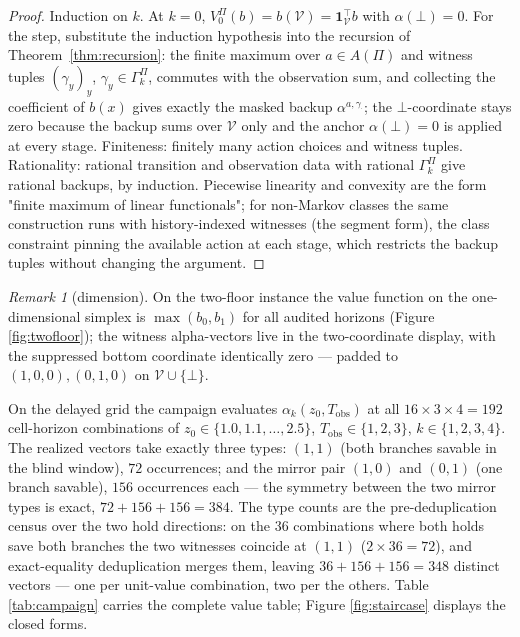 \documentclass[10pt,twocolumn]{article}
\theoremstyle{plain}
\theoremstyle{definition}
\theoremstyle{remark}
\newtheorem{remark}[theorem]{Remark}
\begin{document}
\begin{proof}
Induction on \(k\). At \(k = 0\),
\(V^{\Pi}_{0}(b) = b(\mathcal{V}) = \mathbf{1}_{\mathcal{V}}^{\top} b\)
with \(\alpha(\bot) = 0\). For the step, substitute the induction
hypothesis into the recursion of Theorem~\ref{thm:recursion}: the finite
maximum over \(a \in A(\Pi)\) and witness tuples
\((\gamma_{y})_{y}\), \(\gamma_{y} \in \Gamma^{\Pi}_{k}\), commutes
with the observation sum, and collecting the coefficient of \(b(x)\)
gives exactly the masked backup \(\alpha^{a, \gamma_{\cdot}}\); the
\(\bot\)-coordinate stays zero because the backup sums over
\(\mathcal{V}\) only and the anchor \(\alpha(\bot) = 0\) is applied
at every stage. Finiteness: finitely many action choices and witness
tuples. Rationality: rational transition and observation data with
rational \(\Gamma^{\Pi}_{k}\) give rational backups, by induction.
Piecewise linearity and convexity are the form "finite maximum of linear
functionals"; for non-Markov classes the same construction runs with
history-indexed witnesses (the segment form), the class constraint
pinning the available action at each stage, which restricts the backup
tuples without changing the argument.
\end{proof}

\begin{remark}[dimension]\label{rem:dim}
On the two-floor instance the value function on the one-dimensional
simplex is \(\max(b_{0}, b_{1})\) for all audited horizons (Figure
\ref{fig:twofloor}); the witness alpha-vectors live in the two-coordinate
display, with the suppressed bottom coordinate identically zero --- padded
to \((1,0,0), (0,1,0)\) on \(\mathcal{V} \cup \{\bot\}\).
\end{remark}

On the delayed grid the campaign evaluates
\(\alpha_{k}(z_{0}, T_{\mathrm{obs}})\) at all
\(16 \times 3 \times 4 = 192\) cell-horizon combinations of
\(z_{0} \in \{1.0, 1.1, \dots, 2.5\}\),
\(T_{\mathrm{obs}} \in \{1, 2, 3\}\), \(k \in \{1, 2, 3, 4\}\). The
realized vectors take exactly three types: \((1, 1)\) (both branches
savable in the blind window), \(72\) occurrences; and the mirror pair
\((1, 0)\) and \((0, 1)\) (one branch savable), \(156\) occurrences each
--- the symmetry between the two mirror types is exact,
\(72 + 156 + 156 = 384\). The type counts are the pre-deduplication
census over the two hold directions: on the \(36\) combinations where
both holds save both branches the two witnesses coincide at \((1, 1)\)
(\(2 \times 36 = 72\)), and exact-equality deduplication merges them,
leaving \(36 + 156 + 156 = 348\) distinct vectors --- one per
unit-value combination, two per the others. Table \ref{tab:campaign}
carries the complete value table; Figure \ref{fig:staircase} displays
the closed forms.
\end{document}
